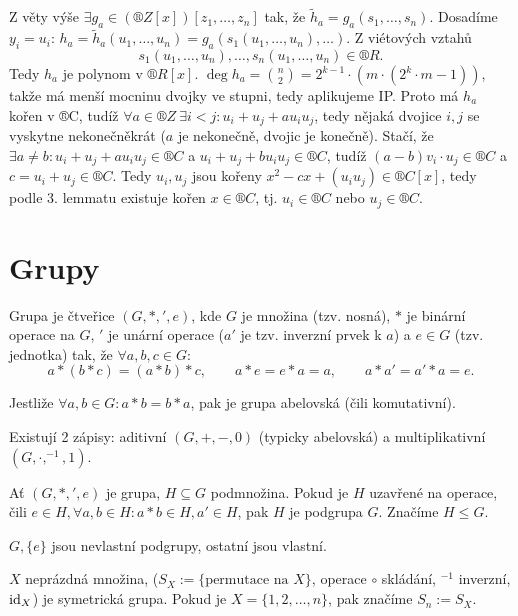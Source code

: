 \documentclass[12pt]{article}                   %
\begin{document}
\begin{veta}
\begin{dukazin}
            Z věty výše $\exists g_a \in (®Z[x])[z_1, …, z_n]$ tak, že $\tilde h_a = g_a(s_1, …, s_n)$. Dosadíme $y_i = u_i$: $h_a = \tilde h_a(u_1, …, u_n) = g_a(s_1(u_1, …, u_n), …)$. Z viétových vztahů
            $$ s_1(u_1, …, u_n), …, s_n(u_1, …, u_n) \in ®R. $$
            Tedy $h_a$ je polynom v $®R[x]$. $\deg h_a = \binom{n}{2} = 2^{k-1}·(m·(2^k·m - 1))$, takže má menší mocninu dvojky ve stupni, tedy aplikujeme IP. Proto má $h_a$ kořen v ®C, tudíž $\forall a \in ®Z\ \exists i < j: u_i + u_j + au_iu_j$, tedy nějaká dvojice $i, j$ se vyskytne nekonečněkrát ($a$ je nekonečně, dvojic je konečně). Stačí, že $\exists a≠b: u_i + u_j + au_iu_j \in ®C$ a $u_i + u_j + bu_iu_j \in ®C$, tudíž $(a-b)v_i·u_j \in ®C$ a $c=u_i + u_j \in ®C$. Tedy $u_i, u_j$ jsou kořeny $x^2 - cx + (u_iu_j)\in ®C[x]$, tedy podle 3. lemmatu existuje kořen $x \in ®C$, tj. $u_i \in ®C$ nebo $u_j \in ®C$.
        \end{dukazin}
    \end{veta}

\section{Grupy}
    \begin{definice}
        Grupa je čtveřice $(G, *, ', e)$, kde $G$ je množina (tzv. nosná), $*$ je binární operace na $G$, $'$ je unární operace ($a'$ je tzv. inverzní prvek k $a$) a $e \in G$ (tzv. jednotka) tak, že $\forall a, b, c \in G$:
        $$ a*(b*c) = (a*b)*c, \qquad a*e = e*a = a, \qquad a*a' = a'*a = e. $$

        Jestliže $\forall a, b \in G: a*b = b*a$, pak je grupa abelovská (čili komutativní).
    \end{definice}

    \begin{poznamka}
        Existují 2 zápisy: aditivní $(G, +, -, 0)$ (typicky abelovská) a multiplikativní $(G, ·, ^{-1}, 1)$.
    \end{poznamka}

    \begin{definice}[Podgrupa]
        Ať $(G,  *, ', e)$ je grupa, $H \subseteq G$ podmnožina. Pokud je $H$ uzavřené na operace, čili $e \in H, \forall a, b \in H: a*b \in H, a' \in H$, pak $H$ je podgrupa $G$. Značíme $H ≤ G$.

        $G, \{e\}$ jsou nevlastní podgrupy, ostatní jsou vlastní.
    \end{definice}

    \begin{priklady}
        $X$ neprázdná množina, ($S_X := \{\text{permutace na } X\}$, operace $\circ$ skládání, $^{-1}$ inverzní, $\operatorname{id}_X$) je symetrická grupa. Pokud je $X = \{1, 2, …, n\}$, pak značíme $S_n := S_X$.
    \end{priklady}
\end{document}
